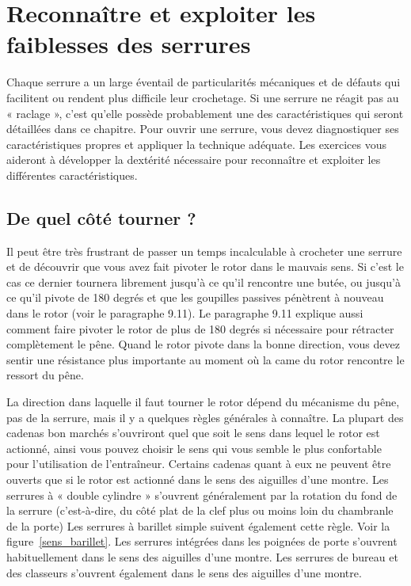 \documentclass[a4paper,french,11pt,twoside]{report}
\begin{document}
\chapter{\label{chap:faiblesses_serrure}Reconnaître et exploiter les faiblesses des serrures}

Chaque serrure a un large éventail de particularités mécaniques et de défauts qui facilitent ou rendent plus difficile leur crochetage. Si une serrure ne réagit pas au « raclage », c'est qu'elle possède probablement une des caractéristiques qui seront détaillées dans ce chapitre. Pour ouvrir une serrure, vous devez diagnostiquer ses caractéristiques propres et appliquer la technique adéquate. Les exercices vous aideront à développer la dextérité nécessaire pour reconnaître et exploiter les différentes caractéristiques.

\section{De quel côté tourner ?}

Il peut être très frustrant de passer un temps incalculable à crocheter une serrure et de découvrir que vous avez fait pivoter le rotor dans le mauvais sens. Si c'est le cas ce dernier tournera librement jusqu'à ce qu'il rencontre une butée, ou jusqu'à ce qu'il pivote de 180 degrés et que les goupilles passives pénètrent à nouveau dans le rotor (voir le paragraphe 9.11). Le paragraphe 9.11 explique aussi comment faire pivoter le rotor de plus de 180 degrés si nécessaire pour rétracter complètement le pêne. Quand le rotor pivote dans la bonne direction, vous devez sentir une résistance plus importante au moment où la came du rotor rencontre le ressort du pêne.

La direction dans laquelle il faut tourner le rotor dépend du mécanisme du pêne, pas de la serrure, mais il y a quelques règles générales à connaître. La plupart des cadenas bon marchés s'ouvriront quel que soit le sens dans lequel le rotor est actionné, ainsi vous pouvez choisir le sens qui vous semble le plus confortable pour l'utilisation de l'entraîneur. Certains cadenas quant à eux ne peuvent être ouverts que si le rotor est actionné dans le sens des aiguilles d'une montre. Les serrures à « double cylindre » s'ouvrent généralement par la rotation du fond de la serrure (c'est-à-dire, du côté plat de la clef plus ou moins loin du chambranle de la porte) Les serrures à barillet simple suivent également cette règle. Voir la figure~\ref{sens_barillet}. Les serrures intégrées dans les poignées de porte s'ouvrent habituellement dans le sens des aiguilles d'une montre. Les serrures de bureau et des classeurs s'ouvrent également dans le sens des aiguilles d'une montre.
\end{document}
